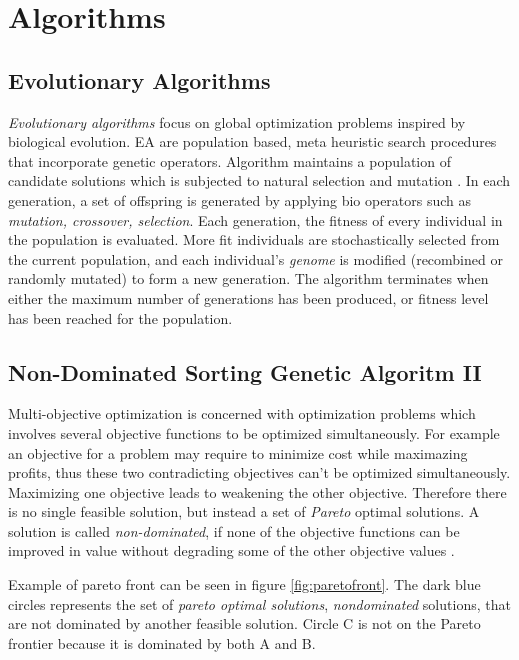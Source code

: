 \documentclass[format=acmsmall, review=false, screen=true]{acmart}
\begin{document}
\section{Algorithms}

\subsection{Evolutionary Algorithms}

\emph{Evolutionary algorithms} focus on global optimization problems inspired by biological evolution. EA are population based, meta heuristic search procedures that incorporate genetic operators. Algorithm maintains a population of candidate solutions which is subjected to natural selection and mutation \cite{back1996evolutionary}. In each generation, a set of offspring is generated by applying bio operators such as \emph{mutation, crossover, selection}. Each generation, the fitness of every individual in the population is evaluated. More fit individuals are stochastically selected from the current population, and each individual's \emph{genome} is modified (recombined or randomly mutated) to form a new generation. The algorithm terminates when either the maximum number of generations has been produced, or fitness level has been reached for the population.

\subsection{Non-Dominated Sorting Genetic Algoritm II}

Multi-objective optimization is concerned with optimization problems which involves several objective functions to be optimized simultaneously. For example an objective for a problem may require to minimize cost while maximazing profits, thus these two contradicting objectives can't be optimized simultaneously. Maximizing one objective leads to weakening the other objective. Therefore there is no single feasible solution, but instead a set of \emph{Pareto} optimal solutions.  A solution is called \emph{non-dominated}, if none of the objective functions can be improved in value without degrading some of the other objective values \cite{deb2014multi}.

Example of pareto front can be seen in figure \ref{fig:paretofront}. The dark blue circles represents the set of \emph{pareto optimal solutions}, \emph{nondominated} solutions, that are not dominated by another feasible solution. Circle C is not on the Pareto frontier because it is dominated by both A and B.
\end{document}
